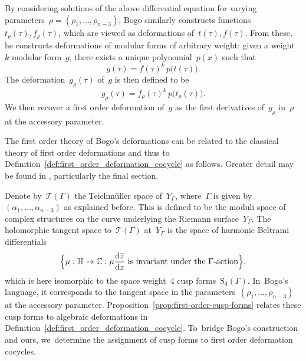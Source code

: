 \documentclass[JEP,XML,SOM,Unicode,published]{cedram}
\theoremstyle{plain}
\theoremstyle{definition}
\newcommand{\tx}{\text}
\newcommand{\bbC}{\ensuremath{\mathbb{C}}}
\newcommand{\cT}{\ensuremath{\mathcal{T}}}
\newcommand{\rmd}{\ensuremath{\mathrm{d}}}
\newcommand{\rmS}{\ensuremath{\mathrm{S}}}
\let\ov\overline
\newcommand{\defcol}{\mathrel{:}}
\newcommand{\condcol}{\mathrel{:}}
\newcommand{\HS}{\ensuremath{\mathbb{H}}}
\let\Ga\Gamma
\newcommand{\dz}{\rmd z}
\begin{document}
By considering solutions of the above differential equation for varying parameters~$\rho = (\rho_1,\ldots,\rho_{n-3})$, Bogo similarly constructs functions~$t_\rho(\tau), f_\rho(\tau)$, which are viewed as deformations of~$t(\tau), f(\tau)$. From these, he constructs deformations of modular forms of arbitrary weight: given a weight~$k$ modular form~$g$, there exists a unique polynomial~$p(x)$ such that
\begin{equation*}
g(\tau) = f(\tau)^k\, p\bigl(t(\tau)\bigr)
\tx{.}
\end{equation*}
The deformation~$g_\rho(\tau)$ of~$g$ is then defined to be
\begin{equation*}
g_\rho(\tau) = f_\rho(\tau)^k\, p\bigl(t_\rho(\tau)\bigr)
\tx{.}
\end{equation*}
We then recover a first order deformation of~$g$ as the first derivatives of~$g_\rho$ in~$\rho$ at the accessory parameter.

The first order theory of Bogo's deformations can be related to the classical theory of first order deformations and thus to Definition~\ref{def:first_order_deformation_cocycle} as follows. Greater detail may be found in \cite[Ch.\,VI]{ahlfors66}, particularly the final section.

Denote by~$\cT(\Gamma)$ the Teichmüller space of~$Y_\Ga$, where~$\Ga$ is given by~$(\alpha_1, \ldots, \alpha_{n-3})$ as explained before. This is defined to be the moduli space of complex structures on the curve underlying the Riemann surface~$Y_\Ga$. The holomorphic tangent space to~$\cT(\Ga)$ at~$Y_\Ga$ is the space of harmonic Beltrami differentials
\begin{equation*}
\Bigl\{
\mu \defcol
\HS \to \bbC
\condcol
\mu \frac{\rmd\ov{z}}{\dz}\text{\ is invariant under the }\Ga\text{-action}
\Bigr\}
\tx{,}
\end{equation*}
which is here isomorphic to the space weight~$4$ cusp forms~$\rmS_4(\Ga)$. In~Bogo's language, it corresponds to the tangent space in the parameters~$(\rho_1, \ldots, \rho_{n-3})$ at the accessory parameter. Proposition~\ref{prop:first-order-cusp-forms} relates these cusp forms to algebraic deformations in Definition~\ref{def:first_order_deformation_cocycle}. To~bridge Bogo's construction and ours, we~determine the assignment of cusp forms to first order deformation cocycles.
\end{document}
